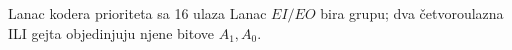 \begin{frame}[t,label=03-s021]{Lanac kodera prioriteta sa 16 ulaza}
\setlength{\parskip}{0pt}
Lanac \(EI/EO\) bira grupu; dva četvoroulazna ILI gejta objedinjuju njene bitove \(A_1,A_0\).
\par\vspace{.5mm}
{\centering\par}
\end{frame}
